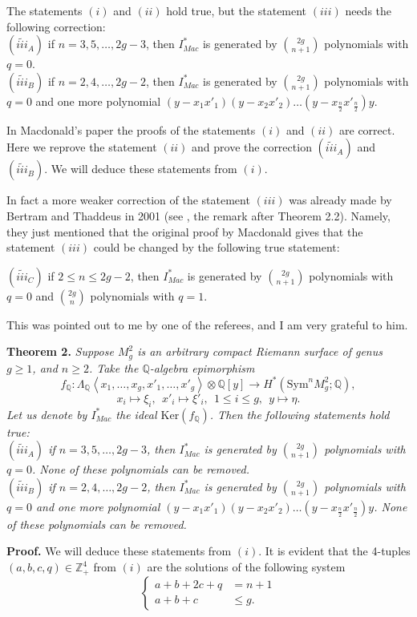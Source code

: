 \documentclass[a4paper,14pt]{article}
\newcommand{\Sym}{\mathrm{Sym}}
\newcommand{\Q}{\mathbb{Q}}
\newcommand{\Z}{\mathbb{Z}}
\begin{document}
The statements $(i)$ and $(ii)$ hold true, but the statement $(iii)$ needs the following correction:\\
$(\widetilde{iii}_A)$ if $n=3,5,\dots,2g-3$, then $I^*_{Mac}$ is generated by $\binom{2g}{n+1}$ polynomials with $q=0$.\\
$(\widetilde{iii}_B)$ if $n=2,4,\dots,2g-2$, then $I^*_{Mac}$ is generated by $\binom{2g}{n+1}$ polynomials with $q=0$ and one more polynomial $(y-x_1x'_1)(y-x_2x'_2)\ldots(y-x_{\frac{n}{2}}x'_{\frac{n}{2}})y$.




In Macdonald's paper the proofs of the statements $(i)$ and $(ii)$ are correct. Here we reprove the statement $(ii)$ and prove the correction $(\widetilde{iii}_A)$ and $(\widetilde{iii}_B)$. We will deduce these statements from $(i)$. 

In fact a more weaker correction of the statement $(iii)$ was already made by Bertram and Thaddeus in 2001 (see \cite{Bert}, the remark after Theorem 2.2). Namely, they just mentioned that the original proof by Macdonald gives that the statement $(iii)$ could be changed by the following true statement: 

\noindent $(\widetilde{iii}_C)$ if $2\le n\le 2g-2$, then $I^*_{Mac}$ is generated by $\binom{2g}{n+1}$ polynomials with $q=0$ and $\binom{2g}{n}$ polynomials with $q=1$.

\noindent This was pointed out to me by one of the referees, and I am very grateful to him.


{\bf Theorem 2.} {\it Suppose $M^2_g$ is an arbitrary compact Riemann surface of genus $g\ge 1$, and $n\ge 2$. Take the $\Q$-algebra epimorphism
$$
f_{\Q}: \Lambda_{\Q} \left< x_1,\ldots,x_g,x'_1,\ldots,x'_g \right>\otimes \Q[y] \to H^*(\Sym^n M^2_g;\Q),
$$
$$
x_i \mapsto \xi_i, \ \  x'_i \mapsto \xi'_i, \ \ 1\le i\le g, \ \ y \mapsto \eta.
$$
Let us denote by $I^*_{Mac}$ the ideal $\mathrm{Ker}(f_{\Q})$. Then the following statements hold true:\\
$(\widetilde{iii}_A)$ if $n=3,5,\dots,2g-3$, then $I^*_{Mac}$ is generated by $\binom{2g}{n+1}$ polynomials with $q=0$. None of these polynomials can be removed.\\
$(\widetilde{iii}_B)$ if $n=2,4,\dots,2g-2$, then $I^*_{Mac}$ is generated by $\binom{2g}{n+1}$ polynomials with $q=0$ and one more polynomial $(y-x_1x'_1)(y-x_2x'_2)\ldots(y-x_{\frac{n}{2}}x'_{\frac{n}{2}})y$.  None of these polynomials can be removed.}


{\bf Proof.} We will deduce these statements from $(i)$. It is evident that the 4-tuples $(a,b,c,q)\in \Z_{+}^4$ from $(i)$ are the solutions of the following system
$$
\left\{ \begin{aligned}
a+b+2c+q & =n+1 \\
a+b+c & \le  g .
\end{aligned}
\right.
$$
\end{document}
